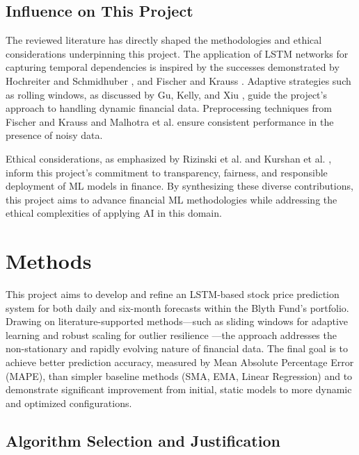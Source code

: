 \documentclass[10pt,twocolumn]{article}
\begin{document}
\subsection{Influence on This Project}

The reviewed literature has directly shaped the methodologies and ethical considerations underpinning this project. The application of LSTM networks for capturing temporal dependencies is inspired by the successes demonstrated by Hochreiter and Schmidhuber \cite{Hochreiter1997LSTM}, and Fischer and Krauss \cite{Fischer2017LSTMFinance}. Adaptive strategies such as rolling windows, as discussed by Gu, Kelly, and Xiu \cite{Gu2020EmpiricalAssetPricing}, guide the project's approach to handling dynamic financial data. Preprocessing techniques from Fischer and Krauss \cite{Fischer2017LSTMFinance} and Malhotra et al. \cite{Malhotra2015LSTMAnomaly} ensure consistent performance in the presence of noisy data.

Ethical considerations, as emphasized by Rizinski et al. \cite{Rizinski2022EthicalMLFintech} and Kurshan et al. \cite{Kurshan2021FairEthicalAI}, inform this project's commitment to transparency, fairness, and responsible deployment of ML models in finance. By synthesizing these diverse contributions, this project aims to advance financial ML methodologies while addressing the ethical complexities of applying AI in this domain.

\section{Methods}

This project aims to develop and refine an LSTM-based stock price prediction system for both daily and six-month forecasts within the Blyth Fund’s portfolio. Drawing on literature-supported methods—such as sliding windows for adaptive learning \cite{Zhan2024SlidingWindow} and robust scaling for outlier resilience \cite{Passalis2021RobustNormalization}—the approach addresses the non-stationary and rapidly evolving nature of financial data. The final goal is to achieve better prediction accuracy, measured by Mean Absolute Percentage Error (MAPE), than simpler baseline methods (SMA, EMA, Linear Regression) and to demonstrate significant improvement from initial, static models to more dynamic and optimized configurations.


\subsection{Algorithm Selection and Justification}
\end{document}
